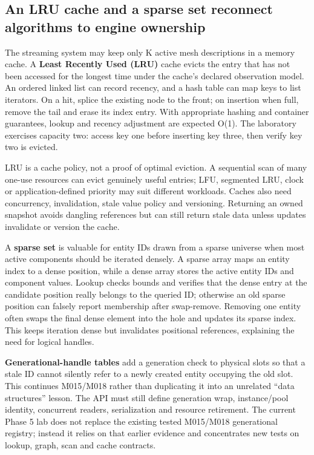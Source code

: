 \subsection{An LRU cache and a sparse set reconnect algorithms to engine ownership}\label{05-engine-i-ch008-an-lru-cache-and-a-sparse-set-reconnect-algorithms-to-engine-ownership}

The streaming system may keep only K active mesh descriptions in a memory cache. A \textbf{Least Recently Used (LRU)} cache evicts the entry that has not been accessed for the longest time under the cache's declared observation model. An ordered linked list can record recency, and a hash table can map keys to list iterators. On a hit, splice the existing node to the front; on insertion when full, remove the tail and erase its index entry. With appropriate hashing and container guarantees, lookup and recency adjustment are expected O(1). The laboratory exercises capacity two: access key one before inserting key three, then verify key two is evicted.

LRU is a cache policy, not a proof of optimal eviction. A sequential scan of many one-use resources can evict genuinely useful entries; LFU, segmented LRU, clock or application-defined priority may suit different workloads. Caches also need concurrency, invalidation, stale value policy and versioning. Returning an owned snapshot avoids dangling references but can still return stale data unless updates invalidate or version the cache.

A \textbf{sparse set} is valuable for entity IDs drawn from a sparse universe when most active components should be iterated densely. A sparse array maps an entity index to a dense position, while a dense array stores the active entity IDs and component values. Lookup checks bounds and verifies that the dense entry at the candidate position really belongs to the queried ID; otherwise an old sparse position can falsely report membership after swap-remove. Removing one entity often swaps the final dense element into the hole and updates its sparse index. This keeps iteration dense but invalidates positional references, explaining the need for logical handles.

\textbf{Generational-handle tables} add a generation check to physical slots so that a stale ID cannot silently refer to a newly created entity occupying the old slot. This continues M015/M018 rather than duplicating it into an unrelated ``data structures'' lesson. The API must still define generation wrap, instance/pool identity, concurrent readers, serialization and resource retirement. The current Phase 5 lab does not replace the existing tested M015/M018 generational registry; instead it relies on that earlier evidence and concentrates new tests on lookup, graph, scan and cache contracts.

